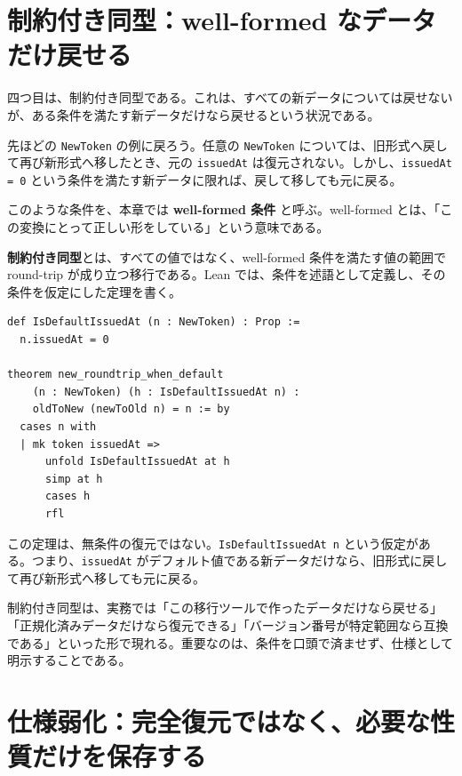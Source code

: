 \section{制約付き同型：well-formed なデータだけ戻せる}

四つ目は、制約付き同型である。これは、すべての新データについては戻せないが、ある条件を満たす新データだけなら戻せるという状況である。

先ほどの \texttt{NewToken} の例に戻ろう。任意の \texttt{NewToken} については、旧形式へ戻して再び新形式へ移したとき、元の \texttt{issuedAt} は復元されない。しかし、\texttt{issuedAt = 0} という条件を満たす新データに限れば、戻して移しても元に戻る。

このような条件を、本章では \textbf{well-formed 条件} と呼ぶ。well-formed とは、「この変換にとって正しい形をしている」という意味である。

\begin{definitionbox}
\textbf{制約付き同型}とは、すべての値ではなく、well-formed 条件を満たす値の範囲で round-trip が成り立つ移行である。Lean では、条件を述語として定義し、その条件を仮定にした定理を書く。
\end{definitionbox}

\begin{listing}[htbp]
\begin{verbatim}
def IsDefaultIssuedAt (n : NewToken) : Prop :=
  n.issuedAt = 0

theorem new_roundtrip_when_default
    (n : NewToken) (h : IsDefaultIssuedAt n) :
    oldToNew (newToOld n) = n := by
  cases n with
  | mk token issuedAt =>
      unfold IsDefaultIssuedAt at h
      simp at h
      cases h
      rfl
\end{verbatim}
\caption{well-formed 条件を仮定した round-trip}
\label{lst:ch21-conditional-roundtrip}
\end{listing}

この定理は、無条件の復元ではない。\texttt{IsDefaultIssuedAt n} という仮定がある。つまり、\texttt{issuedAt} がデフォルト値である新データだけなら、旧形式に戻して再び新形式へ移しても元に戻る。

\begin{softwarebox}
制約付き同型は、実務では「この移行ツールで作ったデータだけなら戻せる」「正規化済みデータだけなら復元できる」「バージョン番号が特定範囲なら互換である」といった形で現れる。重要なのは、条件を口頭で済ませず、仕様として明示することである。
\end{softwarebox}

\section{仕様弱化：完全復元ではなく、必要な性質だけを保存する}

